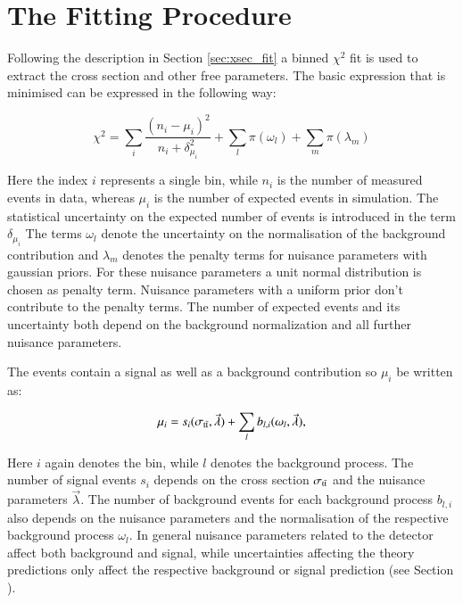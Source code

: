 	
\section{The Fitting Procedure}
\label{sec:xsec_stat}

Following the description in Section \ref{sec:xsec_fit} a binned $\chi^2$ fit is used to extract the cross section and other free parameters.
The basic expression that is minimised can be expressed in the following way:

\begin{equation}
  \chi^2  = \sum_{i} \frac{(n_i-\mu_i)^2}{n_i + \delta_{\mu_i}^2} + \sum_{l} \pi(\omega_l) + \sum_{m} \pi(\lambda_m)
\label{eq:xsec_chisqfunct}
\end{equation}

Here the index $i$ represents a single bin, while $n_i$ is the number of measured events in data, whereas $\mu_i$ is the number
of expected events in simulation. The statistical uncertainty on the expected number of events is introduced in the term $\delta_{\mu_i}$ The terms $\omega_l$ denote the uncertainty on the normalisation of the background contribution and $\lambda_m$
denotes the penalty terms for nuisance parameters with gaussian priors. For these nuisance parameters a unit normal distribution is chosen as penalty term. Nuisance parameters with a uniform prior don't contribute to the penalty terms.
The number of expected events and its uncertainty both depend on the background normalization and all further nuisance parameters.

The events contain a signal as well as a background contribution so $\mu_i$ be written as:

\begin{equation}
\mu_i = s_i(\sigma_\mathrm{t\bar{t}},\vec{\lambda}) 
+ \sum_{l} b_{l,i}(\omega_l,\vec{\lambda}),
\label{eq:xsec_expectev}
\end{equation} 

Here $i$ again denotes the bin, while $l$ denotes the background process. The number of signal events $s_i$ depends on the \ttbar cross section $\sigma_\mathrm{t\bar{t}}$ and the nuisance parameters $\vec{\lambda}$.
The number of background events for each background process $b_{l,i}$ also depends on the nuisance parameters and the normalisation of the respective background process $\omega_l$.
In general nuisance parameters related to the detector affect both background and signal, while uncertainties affecting the theory predictions only affect the respective background or signal prediction (see Section ).


